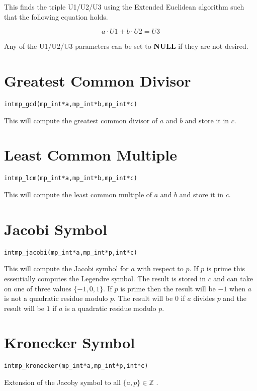 \documentclass[synpaper]{book}
\begin{document}
This finds the triple U1/U2/U3 using the Extended Euclidean algorithm such that the following equation holds.

\begin{equation}
a \cdot U1 + b \cdot U2 = U3
\end{equation}

Any of the U1/U2/U3 parameters can be set to \textbf{NULL} if they are not desired.

\section{Greatest Common Divisor}
\begin{alltt}
int mp_gcd (mp_int * a, mp_int * b, mp_int * c)
\end{alltt}
This will compute the greatest common divisor of $a$ and $b$ and store it in $c$.

\section{Least Common Multiple}
\begin{alltt}
int mp_lcm (mp_int * a, mp_int * b, mp_int * c)
\end{alltt}
This will compute the least common multiple of $a$ and $b$ and store it in $c$.

\section{Jacobi Symbol}
\begin{alltt}
int mp_jacobi (mp_int * a, mp_int * p, int *c)
\end{alltt}
This will compute the Jacobi symbol for $a$ with respect to $p$.  If $p$ is prime this essentially computes the Legendre
symbol.  The result is stored in $c$ and can take on one of three values $\lbrace -1, 0, 1 \rbrace$.  If $p$ is prime
then the result will be $-1$ when $a$ is not a quadratic residue modulo $p$.  The result will be $0$ if $a$ divides $p$
and the result will be $1$ if $a$ is a quadratic residue modulo $p$.

\section{Kronecker Symbol}
\begin{alltt}
int mp_kronecker (mp_int * a, mp_int * p, int *c)
\end{alltt}
Extension of the Jacoby symbol to all $\lbrace a, p \rbrace \in \mathbb{Z}$ .
\end{document}
